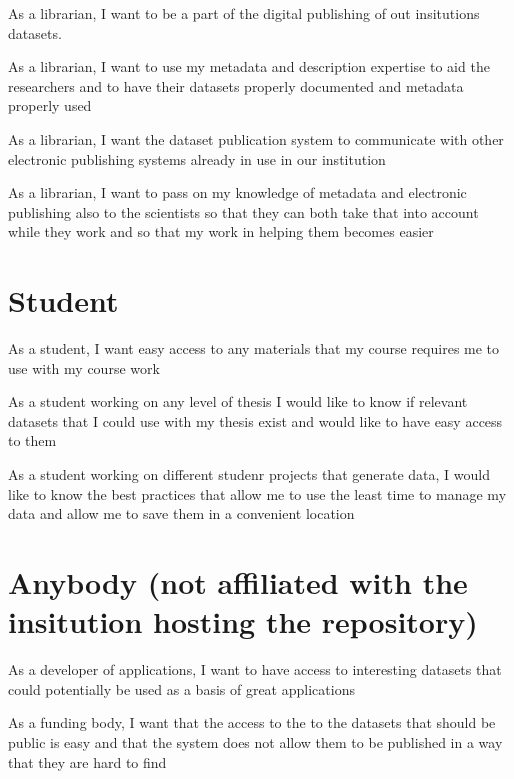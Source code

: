 \begin{compactitem}
    \item As a librarian, I want to be a part of the digital publishing of out
          insitutions datasets.
    \item As a librarian, I want to use my metadata and description expertise
          to aid the researchers and to have their datasets properly documented
          and metadata properly used
    \item As a librarian, I want the dataset publication system to communicate
          with other electronic publishing systems already in use in our
          institution
    \item As a librarian, I want to pass on my knowledge of metadata and
          electronic publishing also to the scientists so that they can both
          take that into account while they work and so that my work in helping
          them becomes easier
\end{compactitem}

\section{Student}

\begin{compactitem}
    \item As a student, I want easy access to any materials that my course
          requires me to use with my course work
    \item As a student working on any level of thesis I would like to know if
          relevant datasets that I could use with my thesis exist and would
          like to have easy access to them
    \item As a student working on different studenr projects that generate
          data, I would like to know the best practices that allow me to use
          the least time to manage my data and allow me to save them in a
          convenient location
\end{compactitem}

\section{Anybody (not affiliated with the insitution hosting the repository)}

\begin{compactitem}
    \item As a developer of applications, I want to have access to interesting
          datasets that could potentially be used as a basis of great
          applications
    \item As a funding body, I want that the access to the to the datasets that
          should be public is easy and that the system does not allow them to
          be published in a way that they are hard to find
\end{compactitem}

